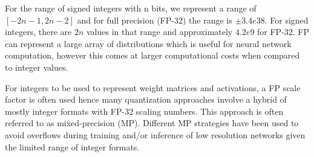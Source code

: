 For the range of signed integers with n bits, we represent a range of $[-2n-1, 2n-2]$
and for full precision (FP-32) the range is $\pm3.4e38$. For signed integers,
there are $2n$ values in that range and approximately $4.2e9$ for FP-32. FP can
represent a large array of distributions which is useful for neural network
computation, however this comes at larger computational costs when compared
to integer values.

For integers to be used to represent weight matrices and activations, a FP scale
factor is often used hence many quantization approaches involve a hybrid of mostly
integer formats with FP-32 scaling numbers. This approach is often referred to
as mixed-precision (MP). Different MP strategies have been used to avoid overflows
during training and/or inference of low resolution networks given the
limited range of integer formats.
